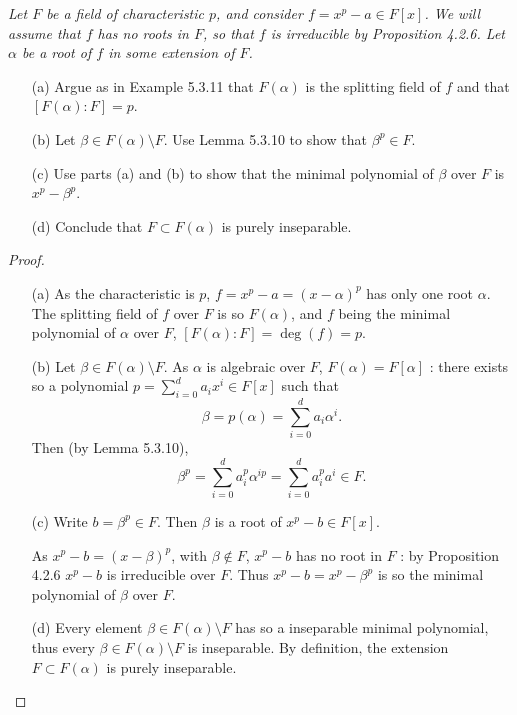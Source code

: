 \documentclass[11pt,a4paper]{article}
\begin{document}
{\it Let $F$ be a field of characteristic $p$, and consider $f = x^p -a \in F[x]$. We will assume that $f$ has no roots in $F$, so that $f$ is irreducible by Proposition 4.2.6. Let $\alpha$ be a root of $f$ in some extension of $F$.
\begin{enumerate}
\item[(a)] Argue as in Example 5.3.11 that $F(\alpha)$ is the splitting field of $f$ and that ${[F(\alpha):F]=p}$.
\item[(b)] Let $\beta \in F(\alpha) \setminus F$. Use Lemma 5.3.10 to show that $\beta^p \in F$.
\item[(c)] Use parts (a) and (b) to show that the minimal polynomial of $\beta$ over $F$ is $x^p - \beta^p$.
\item[(d)] Conclude that $F\subset F(\alpha)$ is purely inseparable.
\end{enumerate}
}

\begin{proof}
\begin{enumerate}
\item[(a)]
As the characteristic is $p$, $f =x^p -a = (x -\alpha)^p$ has only one root $\alpha$. The splitting field of $f$ over $F$ is so $F(\alpha)$, and $f$ being the minimal polynomial of  $\alpha$ over $F$, $[F(\alpha):F] = \deg(f) = p$.

\item[(b)]
Let $\beta \in F(\alpha) \setminus F$. As $\alpha$ is algebraic over $F$, $F(\alpha) = F[\alpha]$ : there exists so a polynomial $p = \sum_{i=0}^d a_i x^i \in F[x]$ such that
$$\beta = p(\alpha) = \sum_{i=0}^d a_i \alpha^i.$$
Then  (by Lemma 5.3.10), $$\beta^p =  \sum_{i=0}^d a_i^p \alpha^{ip} =  \sum_{i=0}^d a_i^p a^{i} \in F .$$

\item[(c)]
Write $b = \beta^p \in F$. Then $\beta$ is a root of $x^p -b \in F[x]$.

As $x^p-b = (x-\beta)^p$, with $\beta \not \in F$, $x^p -b$ has no root in $F$ : by Proposition 4.2.6 $x^p - b$ is irreducible over $F$. Thus $x^p -b = x^p -\beta^p$ is so the minimal polynomial of $\beta$ over $F$.

\item[(d)] Every element $\beta \in F(\alpha) \setminus F$ has so a inseparable minimal polynomial, thus every $\beta\in F(\alpha) \setminus F$ is inseparable. By definition, the extension $F\subset F(\alpha)$ is purely inseparable.
\end{enumerate}
\end{proof}
\end{document}
